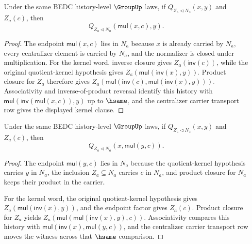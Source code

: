 \begin{theorem}
\label{thm:subgroup-centralizer-quotient-kernel-left-endpoint-right-centralizer-mul-closed}
Under the same BEDC history-level $\GroupUp$ laws, if
$Q_{Z_a\triangleleft N_a}(x,y)$ and $Z_a(c)$, then
$$
Q_{Z_a\triangleleft N_a}(\mathsf{mul}(x,c),y).
$$
\end{theorem}
\begin{proof}
The endpoint $\mathsf{mul}(x,c)$ lies in $N_a$ because $x$ is already carried
by $N_a$, every centralizer element is carried by $N_a$, and the normalizer is
closed under multiplication. For the kernel word, inverse closure gives
$Z_a(\mathsf{inv}(c))$, while the original quotient-kernel hypothesis gives
$Z_a(\mathsf{mul}(\mathsf{inv}(x),y))$. Product closure for $Z_a$ therefore
gives
$Z_a(\mathsf{mul}(\mathsf{inv}(c),\mathsf{mul}(\mathsf{inv}(x),y)))$.
Associativity and inverse-of-product reversal identify this history with
$\mathsf{mul}(\mathsf{inv}(\mathsf{mul}(x,c)),y)$ up to $\hsame$, and the
centralizer carrier transport row gives the displayed kernel clause.
\end{proof}

\begin{theorem}
\label{thm:subgroup-centralizer-quotient-kernel-right-endpoint-right-centralizer-mul-closed}
Under the same BEDC history-level $\GroupUp$ laws, if
$Q_{Z_a\triangleleft N_a}(x,y)$ and $Z_a(c)$, then
$$
Q_{Z_a\triangleleft N_a}(x,\mathsf{mul}(y,c)).
$$
\end{theorem}
\begin{proof}
The endpoint $\mathsf{mul}(y,c)$ lies in $N_a$ because the
quotient-kernel hypothesis carries $y$ in $N_a$, the inclusion
$Z_a\subseteq N_a$ carries $c$ in $N_a$, and product closure for $N_a$
keeps their product in the carrier.

For the kernel word, the original quotient-kernel hypothesis gives
$Z_a(\mathsf{mul}(\mathsf{inv}(x),y))$, and the endpoint factor gives
$Z_a(c)$. Product closure for $Z_a$ yields
$Z_a(\mathsf{mul}(\mathsf{mul}(\mathsf{inv}(x),y),c))$.
Associativity compares this history with
$\mathsf{mul}(\mathsf{inv}(x),\mathsf{mul}(y,c))$, and the centralizer
carrier transport row moves the witness across that $\hsame$ comparison.
\end{proof}

